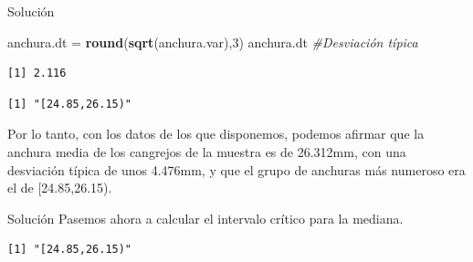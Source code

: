 \documentclass[
  ignorenonframetext,
]{beamer}
\newenvironment{Shaded}{\begin{snugshade}}{\end{snugshade}}
\newcommand{\CommentTok}[1]{\textcolor[rgb]{0.56,0.35,0.01}{\textit{#1}}}
\newcommand{\DecValTok}[1]{\textcolor[rgb]{0.00,0.00,0.81}{#1}}
\newcommand{\FloatTok}[1]{\textcolor[rgb]{0.00,0.00,0.81}{#1}}
\newcommand{\FunctionTok}[1]{\textcolor[rgb]{0.13,0.29,0.53}{\textbf{#1}}}
\newcommand{\NormalTok}[1]{#1}
\newcommand{\OtherTok}[1]{\textcolor[rgb]{0.56,0.35,0.01}{#1}}
\newcommand{\SpecialCharTok}[1]{\textcolor[rgb]{0.81,0.36,0.00}{\textbf{#1}}}
\begin{document}
\begin{frame}[fragile]{Solución}
\label{soluciuxf3n-32}
\begin{Shaded}
\begin{Highlighting}[]
\NormalTok{anchura.dt }\OtherTok{=} \FunctionTok{round}\NormalTok{(}\FunctionTok{sqrt}\NormalTok{(anchura.var),}\DecValTok{3}\NormalTok{)}
\NormalTok{anchura.dt }\CommentTok{\#Desviación típica}
\end{Highlighting}
\end{Shaded}

\begin{verbatim}
[1] 2.116
\end{verbatim}

\begin{Shaded}
\end{Shaded}

\begin{verbatim}
[1] "[24.85,26.15)"
\end{verbatim}

Por lo tanto, con los datos de los que disponemos, podemos afirmar que
la anchura media de los cangrejos de la muestra es de 26.312mm, con una
desviación típica de unos 4.476mm, y que el grupo de anchuras más
numeroso era el de {[}24.85,26.15).
\end{frame}

\begin{frame}[fragile]{Solución}
\label{soluciuxf3n-33}
Pasemos ahora a calcular el intervalo crítico para la mediana.

\begin{Shaded}
\end{Shaded}

\begin{verbatim}
[1] "[24.85,26.15)"
\end{verbatim}
\end{frame}
\end{document}
